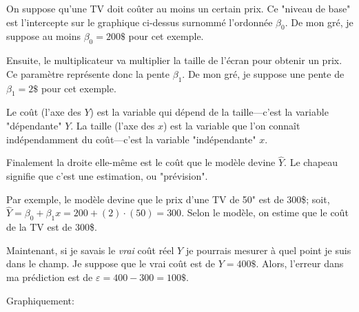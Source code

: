 \documentclass[10pt, french]{article}
\begin{document}
\begin{multicols*}{2}
\begin{center}

\end{center}

On suppose qu'une TV doit coûter au moins un certain prix. Ce "niveau de base" est l'intercepte sur le graphique ci-dessus surnommé l'ordonnée $\beta_{0}$. De mon gré, je suppose au moins $\beta_{0} = 200\$$ pour cet exemple. 

Ensuite, le multiplicateur va multiplier la taille de l'écran pour obtenir un prix. Ce paramètre représente donc la pente $\beta_{1}$. De mon gré, je suppose une pente de $\beta_{1} = 2\$$ pour cet exemple. 

Le coût (l'axe des $Y$) est la variable qui dépend de la taille---c'est la variable "dépendante" $Y$. La taille (l'axe des $x$) est la variable que l'on connaît indépendamment du coût---c'est la variable "indépendante" $x$. 

Finalement la droite elle-même est le coût que le modèle devine $\hat{Y}$. Le chapeau signifie que c'est une estimation, ou "prévision".

Par exemple, le modèle devine que le prix d'une TV de 50" est de 300\$; soit, $\hat{Y} = \beta_{0} + \beta_{1} x = 200 + (2) \cdot (50) = 300$. Selon le modèle, on estime que le coût de la TV est de 300\$.

Maintenant, si je savais le \textit{vrai} coût réel $Y$ je pourrais mesurer à quel point je suis dans le champ. Je suppose que le vrai coût est de $Y = 400\$$. Alors, l'erreur dans ma prédiction est de $\varepsilon = 400 - 300 = 100\$$. 

Graphiquement:
\begin{center}

\begin{tikzpicture}[x=0.75pt,y=0.75pt,yscale=-1,xscale=1]


\end{tikzpicture}
\end{center}
\end{multicols*}
\end{document}
